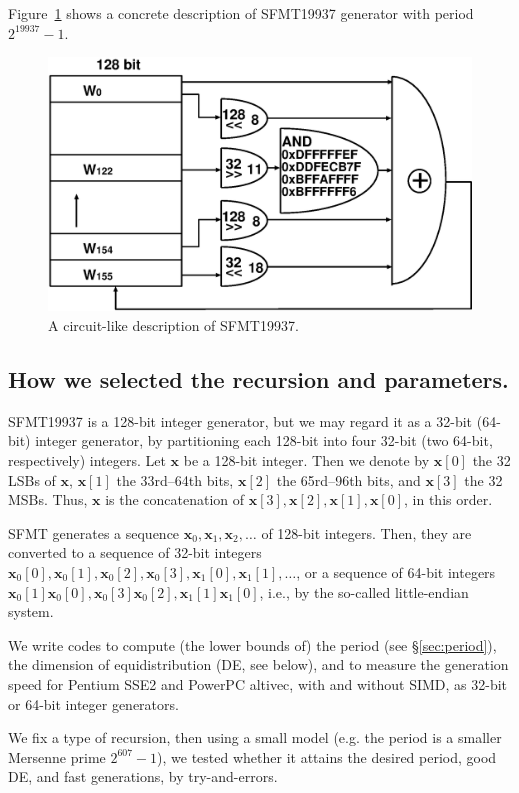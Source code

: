 \documentclass[acmnow]{acmtrans2m}
\def\bx{{{\mathbf x}}}
\begin{document}
Figure~\ref{fig:SFMT-B2} shows a concrete description
of SFMT19937 generator with period $2^{19937}-1$.
\begin{figure}
\begin{center}
\includegraphics[width=0.7\linewidth]{sfmt-b2.eps}
\end{center}
\caption{A circuit-like description of SFMT19937.}
\label{fig:SFMT-B2}
\end{figure}

\subsection{How we selected the recursion and parameters.}
SFMT19937 is a 128-bit integer generator, but 
we may regard it as a 32-bit (64-bit) integer generator, by
partitioning each 128-bit into four 32-bit (two 64-bit, respectively)
integers. 
Let $\bx$ be a 128-bit integer. Then we denote
by 
$\bx[0]$ the 32 LSBs of $\bx$, 
$\bx[1]$ the 33rd--64th bits,
$\bx[2]$ the 65rd--96th bits,
and $\bx[3]$ the 32 MSBs. Thus, $\bx$ is
the concatenation of 
$\bx[3], \bx[2], \bx[1], \bx[0]$, in this order.

SFMT generates a sequence
$\bx_0, \bx_1, \bx_2, \ldots$ of 128-bit integers. 
Then, they are converted to a sequence of 32-bit integers
$\bx_0[0], \bx_0[1], \bx_0[2], \bx_0[3], \bx_1[0], \bx_1[1],\ldots$,
or a sequence of 64-bit integers
$\bx_0[1]\bx_0[0], \bx_0[3]\bx_0[2], \bx_1[1]\bx_1[0]$,
i.e., by the so-called little-endian system.

We write codes to compute (the lower bounds of) the period
(see \S\ref{sec:period}),
the dimension of equidistribution (DE, see below),
and to measure the generation speed for Pentium SSE2
and PowerPC altivec, with and without SIMD, as 32-bit 
or 64-bit integer generators. 

We fix a type of recursion,
then using a small model (e.g. the period is a smaller
Mersenne prime $2^{607}-1$), we tested whether it
attains the desired period, good DE, and fast generations,
by try-and-errors.
\end{document}
